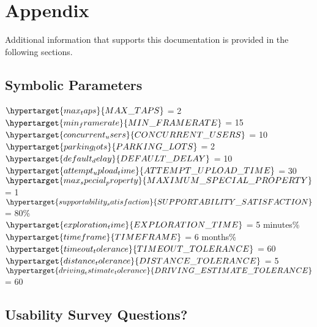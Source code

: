 \documentclass[12pt, titlepage]{article}
\begin{document}
				
% 

% 
\newpage

\section{Appendix}

Additional information that supports this documentation is provided in the
following sections.

\subsection{Symbolic Parameters}
\noindent $\hypertarget{max_taps}{MAX\_TAPS}$ = 2 \\
$\hypertarget{min_framerate}{MIN\_FRAMERATE}$ = 15\\
$\hypertarget{concurrent_users}{CONCURRENT\_USERS}$ = 10\\
$\hypertarget{parking_lots}{PARKING\_LOTS}$ = 2\\
$\hypertarget{default_delay}{DEFAULT\_DELAY}$ = 10\\
$\hypertarget{attempt_upload_time}{ATTEMPT\_UPLOAD\_TIME}$ = 30 \\
$\hypertarget{max_special_property}{MAXIMUM\_SPECIAL\_PROPERTY}$ = 1 \\
$\hypertarget{supportability_satisfaction}{SUPPORTABILITY\_SATISFACTION}$ = 80\%
\\
$\hypertarget{exploration_time}{EXPLORATION\_TIME}$ = 5 minutes\% \\
$\hypertarget{timeframe}{TIMEFRAME}$ = 6 months\% \\
$\hypertarget{timeout_tolerance}{TIMEOUT\_TOLERANCE}$ = 60 \\
$\hypertarget{distance_tolerance}{DISTANCE\_TOLERANCE}$ = 5 \\
$\hypertarget{driving_estimate_tolerance}{DRIVING\_ESTIMATE\_TOLERANCE}$ = 60 \\
\subsection{Usability Survey Questions?}
\label{sec:7.2}
\end{document}
